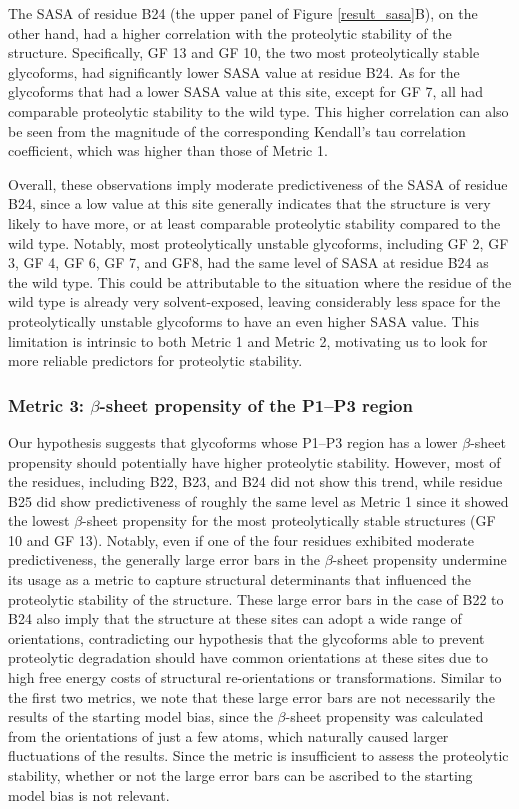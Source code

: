 \documentclass[sn-vancouver]{sn-jnl}
\begin{document}
The SASA of residue B24 (the upper panel of Figure \ref{result_sasa}B), on the other hand, had a higher correlation with the proteolytic stability of the structure. Specifically, GF 13 and GF 10, the two most proteolytically stable glycoforms, had significantly lower SASA value at residue B24. As for the glycoforms that had a lower SASA value at this site, except for GF 7, all had comparable proteolytic stability to the wild type. This higher correlation can also be seen from the magnitude of the corresponding Kendall's tau correlation coefficient, which was higher than those of Metric 1.

Overall, these observations imply moderate predictiveness of the SASA of residue B24, since a low value at this site generally indicates that the structure is very likely to have more, or at least comparable proteolytic stability compared to the wild type. Notably, most proteolytically unstable glycoforms, including GF 2, GF 3, GF 4, GF 6, GF 7, and GF8, had the same level of SASA at residue B24 as the wild type. This could be attributable to the situation where the residue of the wild type is already very solvent-exposed, leaving considerably less space for the proteolytically unstable glycoforms to have an even higher SASA value. This limitation is intrinsic to both Metric 1 and Metric 2, motivating us to look for more reliable predictors for proteolytic stability. 

\subsubsection*{Metric 3: \texorpdfstring{$\beta$}{Lg}-sheet propensity of the P1--P3 region}
Our hypothesis suggests that glycoforms whose P1--P3 region has a lower $\beta$-sheet propensity should potentially have higher proteolytic stability. However, most of the residues, including B22, B23, and B24 did not show this trend, while residue B25 did show predictiveness of roughly the same level as Metric 1 since it showed the lowest $\beta$-sheet propensity for the most proteolytically stable structures (GF 10 and GF 13). Notably, even if one of the four residues exhibited moderate predictiveness, the generally large error bars in the $\beta$-sheet propensity undermine its usage as a metric to capture structural determinants that influenced the proteolytic stability of the structure. These large error bars in the case of B22 to B24 also imply that the structure at these sites can adopt a wide range of orientations, contradicting our hypothesis that the glycoforms able to prevent proteolytic degradation should have common orientations at these sites due to high free energy costs of structural re-orientations or transformations. Similar to the first two metrics, we note that these large error bars are not necessarily the results of the starting model bias, since the $\beta$-sheet propensity was calculated from the orientations of just a few atoms, which naturally caused larger fluctuations of the results. Since the metric is insufficient to assess the proteolytic stability, whether or not the large error bars can be ascribed to the starting model bias is not relevant. 
\end{document}
